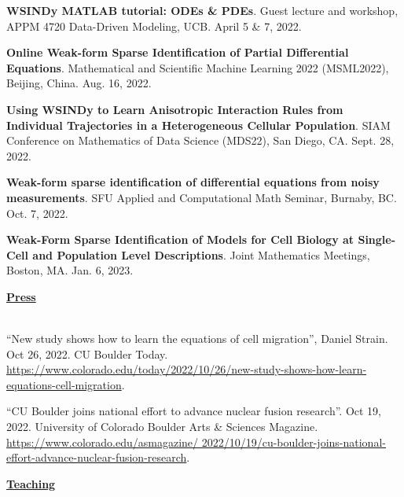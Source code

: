 \documentclass[letterpaper,11pt,oneside]{article}
\newcommand{\headr}[1]{\vspace{10pt}\uline{\Large{\textbf{#1}} \hfill } \\ \vspace{-10pt}\\}
\begin{document}
\begin{enumerate}[label={[\arabic*]}]
\item \textbf{WSINDy MATLAB tutorial: ODEs \& PDEs}. Guest lecture and workshop, APPM 4720 Data-Driven Modeling, UCB. April 5 \& 7, 2022.
\item \textbf{Online Weak-form Sparse Identification of Partial Differential Equations}. Mathematical and Scientific Machine Learning 2022 (MSML2022), Beijing, China. Aug. 16, 2022.
\item \textbf{Using WSINDy to Learn Anisotropic Interaction 
Rules from Individual Trajectories in a Heterogeneous Cellular Population}. SIAM Conference on Mathematics of Data Science (MDS22), San Diego, CA. Sept. 28, 2022.
\item \textbf{Weak-form sparse identification of differential equations from noisy measurements}. SFU Applied and Computational Math Seminar, Burnaby, BC. Oct. 7, 2022.
\item \textbf{Weak-Form Sparse Identification of Models for Cell Biology at Single-Cell and Population Level Descriptions}. Joint Mathematics Meetings, Boston, MA. Jan. 6, 2023.
\end{enumerate}

\headr{Press}

\begin{sloppypar}
\begin{enumerate}[label={[\arabic*]}]
\item \raggedright``New study shows how to learn the equations of cell migration'', Daniel Strain. Oct 26, 2022. CU Boulder Today. \url{https://www.colorado.edu/today/2022/10/26/new-study-shows-how-learn-equations-cell-migration}.
\item 
``CU Boulder joins national effort to advance nuclear fusion research''. Oct 19, 2022. University of Colorado Boulder Arts \& Sciences Magazine. \url{https://www.colorado.edu/asmagazine/
2022/10/19/cu-boulder-joins-national-effort-advance-nuclear-fusion-research}.
\end{enumerate}
\end{sloppypar}


\headr{Teaching}
\end{document}

